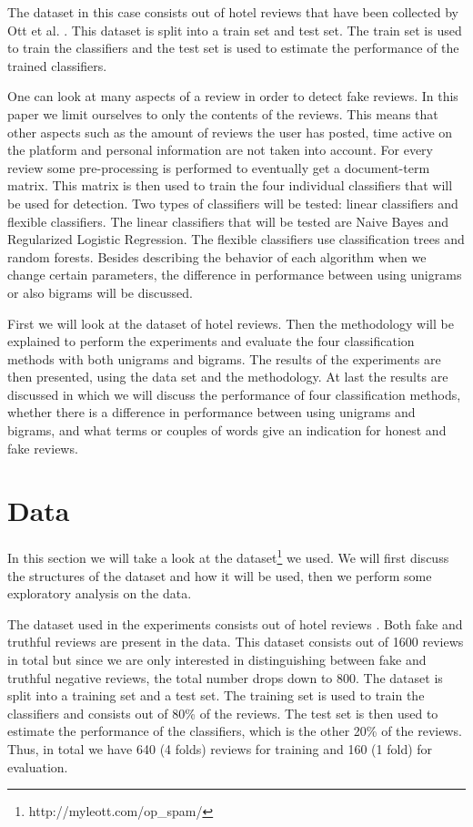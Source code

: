 \documentclass[a4paper,11pt]{article}
\begin{document}
The dataset in this case consists out of hotel reviews that have been collected by Ott et al. \cite{Ott:2011}. This dataset is split into a train set and test set. The train set is used to train the classifiers and the test set is used to estimate the performance of the trained classifiers. %

One can look at many aspects of a review in order to detect fake reviews. In this paper we limit ourselves to only the contents of the reviews. This means that other aspects such as the amount of reviews the user has posted, time active on the platform and personal information are not taken into account. For every review some pre-processing is performed to eventually get a document-term matrix. This matrix is then used to train the four individual classifiers that will be used for detection. Two types of classifiers will be tested: linear classifiers and flexible classifiers. The linear classifiers that will be tested are Naive Bayes and Regularized Logistic Regression. The flexible classifiers use classification trees and random forests. Besides describing the behavior of each algorithm when we change certain parameters, the difference in performance between using unigrams or also bigrams will be discussed. %

First we will look at the dataset of hotel reviews. Then the methodology will be explained to perform the experiments and evaluate the four classification methods with both unigrams and bigrams. The results of the experiments are then presented, using the data set and the methodology. At last the results are discussed in which we will discuss the performance of four classification methods, whether there is a difference in performance between using unigrams and bigrams, and what terms or couples of words give an indication for honest and fake reviews. %

\section{Data}
\label{section:data}
In this section we will take a look at the dataset\footnote{http://myleott.com/op_spam/} we used. We will first discuss the structures of the dataset and how it will be used, then we perform some exploratory analysis on the data. %

The dataset used in the experiments consists out of hotel reviews \cite{Ott:2011}. Both fake and truthful reviews are present in the data. This dataset consists out of 1600 reviews in total but since we are only interested in distinguishing between fake and truthful negative reviews, the total number drops down to 800. The dataset is split into a training set and a test set. The training set is used to train the classifiers and consists out of 80\% of the reviews. The test set is then used to estimate the performance of the classifiers, which is the other 20\% of the reviews. Thus, in total we have 640 (4 folds) reviews for training and 160 (1 fold) for evaluation. %
\end{document}
